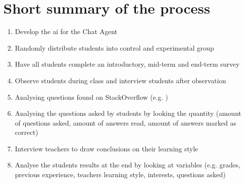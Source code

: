 \section{Short summary of the process}
\label{chapter4:the_process}
\begin{enumerate}
	\item Develop the \gls{ai} for the Chat Agent
	\item Randomly distribute students into control and experimental group
	\item Have all students complete an introductory, mid-term and end-term survey
	\item Observe students during class and interview students after observation
	\item Analysing questions found on StackOverflow (e.g. \citet{Movshovitz-Attias2013})
	\item Analysing the questions asked by students by looking the quantity 
	(amount of questions asked, amount of answers read, amount of answers marked as correct)
	\item Interview teachers to draw conclusions on their learning style
	\item Analyse the students results at the end by looking at variables 
	(e.g. grades, previous experience, teachers learning style, interests, questions asked)
\end{enumerate}
